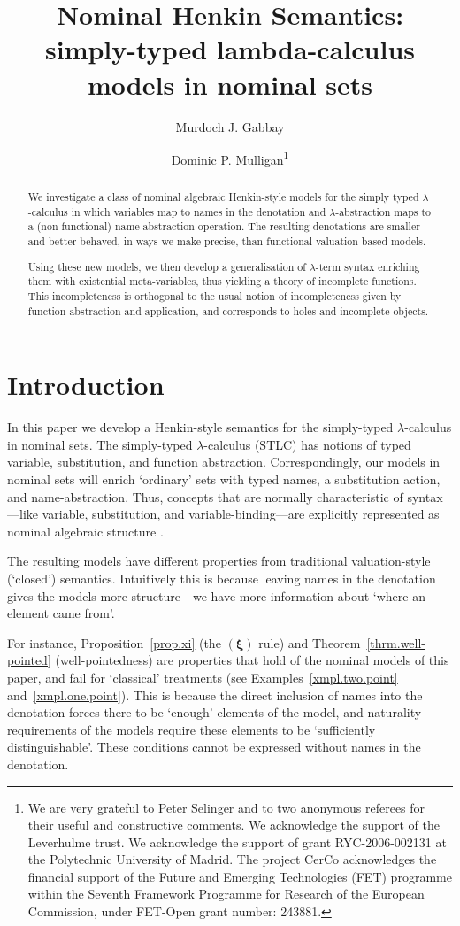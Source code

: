 \documentclass[submission,copyright]{eptcs}
\title{Nominal Henkin Semantics: simply-typed lambda-calculus models in nominal sets}
\date{}
\author{Murdoch J. Gabbay
\and
Dominic P. Mulligan\thanks{\tiny 
We are very grateful to Peter Selinger and to two anonymous referees for their useful and constructive comments.
We acknowledge the support of the Leverhulme trust.
We acknowledge the support of grant RYC-2006-002131 at the Polytechnic University of Madrid. 
The project CerCo acknowledges the financial support of the Future and Emerging Technologies (FET) programme within the Seventh Framework Programme for Research of the European Commission, under FET-Open grant number: 243881.  
}}
\newcommand{\rulefont}[1]{\ensuremath{(\mathbf{#1})}}
\begin{document}
\maketitle
\begin{abstract}
We investigate a class of nominal algebraic Henkin-style models for the simply typed $\lambda$-calculus in which variables map to names in the denotation and $\lambda$-abstraction maps to a (non-functional) name-abstraction operation.
The resulting denotations are smaller and better-behaved, in ways we make precise, than functional valuation-based models.

Using these new models, we then develop a generalisation of $\lambda$-term syntax enriching them with existential meta-variables, thus yielding a theory of incomplete functions.
This incompleteness is orthogonal to the usual notion of incompleteness given by function abstraction and application, and corresponds to holes and incomplete objects. 
\end{abstract}




\section{Introduction}
\label{sect.introduction}

In this paper we develop a Henkin-style semantics for the simply-typed $\lambda$-calculus in nominal sets.
The simply-typed $\lambda$-calculus (STLC) has notions of typed variable, substitution, and function abstraction.
Correspondingly, our models in nominal sets will enrich `ordinary' sets with typed names, a substitution action, and name-abstraction.
Thus, concepts that are normally characteristic of syntax---like variable, substitution, and variable-binding---are explicitly represented as nominal algebraic structure \cite{gabbay:nomuae}.

The resulting models have different properties from traditional valuation-style (`closed') semantics.
Intuitively this is because leaving names in the denotation gives the models more structure---we have more information about `where an element came from'.

For instance, Proposition~\ref{prop.xi} (the \rulefont{\xi} rule) and Theorem~\ref{thrm.well-pointed} (well-pointedness) are properties that hold of the nominal models of this paper, and fail for `classical' treatments (see Examples~\ref{xmpl.two.point} and~\ref{xmpl.one.point}). 
This is because the direct inclusion of names into the denotation forces there to be `enough' elements of the model, and naturality requirements of the models require these elements to be `sufficiently distinguishable'.
These conditions cannot be expressed without names in the denotation.
\end{document}
